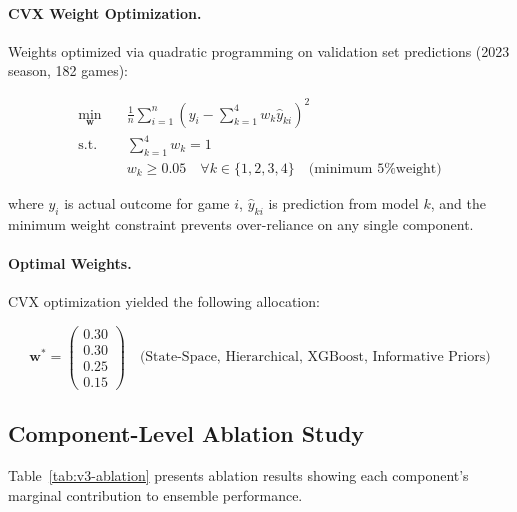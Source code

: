 \paragraph{CVX Weight Optimization.}
Weights optimized via quadratic programming on validation set predictions (2023 season, 182 games):

\begin{equation}
\label{eq:v3-cvx-objective}
\begin{aligned}
\min_{\mathbf{w}} \quad & \frac{1}{n} \sum_{i=1}^{n} \left( y_i - \sum_{k=1}^{4} w_k \hat{y}_{ki} \right)^2 \\
\text{s.t.} \quad & \sum_{k=1}^{4} w_k = 1 \\
& w_k \geq 0.05 \quad \forall k \in \{1,2,3,4\} \quad \text{(minimum 5\% weight)}
\end{aligned}
\end{equation}

\noindent where $y_i$ is actual outcome for game $i$, $\hat{y}_{ki}$ is prediction from model $k$, and the minimum weight constraint prevents over-reliance on any single component.

\paragraph{Optimal Weights.}
CVX optimization yielded the following allocation:

\begin{equation}
\label{eq:v3-optimal-weights}
\mathbf{w}^* = \begin{pmatrix} 0.30 \\ 0.30 \\ 0.25 \\ 0.15 \end{pmatrix} \quad \text{(State-Space, Hierarchical, XGBoost, Informative Priors)}
\end{equation}

\subsection{Component-Level Ablation Study}

Table~\ref{tab:v3-ablation} presents ablation results showing each component's marginal contribution to ensemble performance.

